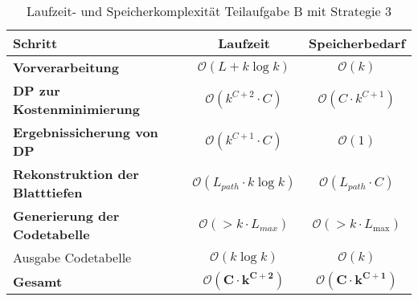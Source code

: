\documentclass[a4paper,10pt,ngerman]{scrartcl}
\begin{document}
\vspace{0.2cm}

\begin{table}[H]
\centering
\begin{tabular}{|l|c|c|}
\hline
\textbf{Schritt} & \textbf{Laufzeit} & \textbf{Speicherbedarf} \\
\hline
\textbf{Vorverarbeitung} & $\mathcal{O}(L + k \log k)$ & $\mathcal{O}(k)$ \\
\textbf{DP zur Kostenminimierung} & $\mathcal{O}(k^{C+2}\cdot C)$ & $\mathcal{O}(C \cdot k^{C+1})$ \\
\textbf{Ergebnissicherung von DP} & $\mathcal{O}(k^{C+1}\cdot C)$ & $\mathcal{O}(1)$ \\
\textbf{Rekonstruktion der Blatttiefen} & $\mathcal{O}(L_{path} \cdot k \log k)$ & $\mathcal{O}(L_{path} \cdot C)$ \\
\textbf{Generierung der Codetabelle} & $\mathcal{O}(>k\cdot L_{max})$ & $\mathcal{O}(>k\cdot L_{\text{max}})$ \\
Ausgabe Codetabelle & $\mathcal{O}(k \log k)$ & $\mathcal{O}(k)$ \\
\hline
\textbf{Gesamt} & $\boldsymbol{\mathcal{O}(C\cdot k^{C+2})}$ & $\boldsymbol{\mathcal{O}(C\cdot k^{C+1})}$ \\
\hline
\end{tabular}
\caption{Laufzeit- und Speicherkomplexität Teilaufgabe B mit Strategie 3}
\end{table}
\end{document}
